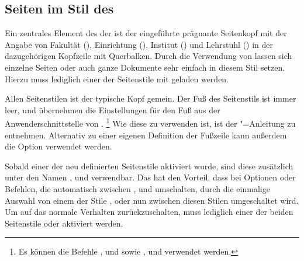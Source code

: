 \subsection{Seiten im Stil des \CDs}
\begin{Declaration}[v2.02]{}
\begin{Declaration}[v2.02]{}
\begin{Declaration}[v2.02]{}
\printdeclarationlist%
\label{sec:tudheadings}
%
Ein zentrales Element des \CDs der \TnUD ist der eingeführte prägnante 
Seitenkopf mit der Angabe von Fakultät (), Einrichtung 
(), Institut () und Lehrstuhl 
() in der dazugehörigen Kopfzeile mit Querbalken. Durch die 
Verwendung von  lassen sich einzelne Seiten oder auch 
ganze Dokumente sehr einfach in diesem Stil setzen. Hierzu muss lediglich einer 
der Seitenstile mit  geladen werden. 

Allen Seitenstilen ist der typische Kopf gemein. Der Fuß des Seitenstils 
 ist immer leer,  und 
 übernehmen die Einstellungen für den Fuß aus der 
Anwenderschnittstelle von .%
\footnote{%
  Es können die Befehle ,  und  sowie 
  ,  und  verwendet werden.
}
Wie diese zu verwenden ist, ist der \KOMAScript"=Anleitung zu entnehmen. 
Alternativ zu einer eigenen Definition der Fußzeile kann außerdem die Option 
 verwendet werden.

Sobald einer der neu definierten Seitenstile aktiviert wurde, sind diese 
zusätzlich unter den Namen ,  und 
 verwendbar. Das hat den Vorteil, dass bei Optionen oder 
Befehlen, die automatisch zwischen ,  
und  umschalten, durch die einmalige Auswahl von einem der 
Stile ,  oder 
 nun zwischen diesen Stilen umgeschaltet wird. 
%
Um auf das normale Verhalten zurückzuschalten, muss lediglich einer der beiden 
Seitenstile  oder  
aktiviert werden.
\end{Declaration}
\end{Declaration}
\end{Declaration}

